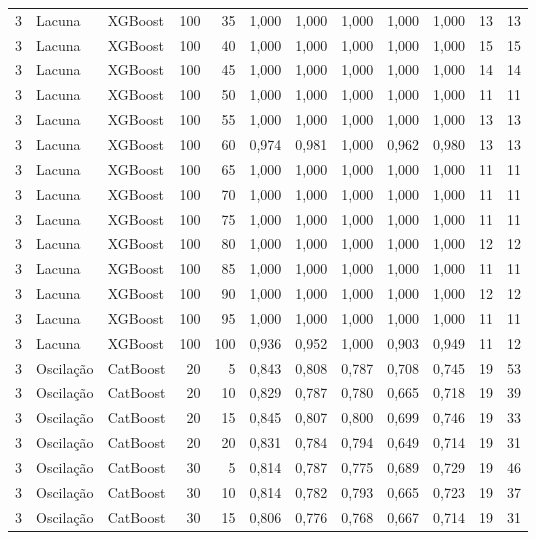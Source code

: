 \begin{longtable}{@{}rllrrrrrrrrr@{}}
3 & Lacuna & XGBoost & 100 & 35 & 1,000 & 1,000 & 1,000 & 1,000 & 1,000 & 13 & 13 \\
3 & Lacuna & XGBoost & 100 & 40 & 1,000 & 1,000 & 1,000 & 1,000 & 1,000 & 15 & 15 \\
3 & Lacuna & XGBoost & 100 & 45 & 1,000 & 1,000 & 1,000 & 1,000 & 1,000 & 14 & 14 \\
3 & Lacuna & XGBoost & 100 & 50 & 1,000 & 1,000 & 1,000 & 1,000 & 1,000 & 11 & 11 \\
3 & Lacuna & XGBoost & 100 & 55 & 1,000 & 1,000 & 1,000 & 1,000 & 1,000 & 13 & 13 \\
3 & Lacuna & XGBoost & 100 & 60 & 0,974 & 0,981 & 1,000 & 0,962 & 0,980 & 13 & 13 \\
3 & Lacuna & XGBoost & 100 & 65 & 1,000 & 1,000 & 1,000 & 1,000 & 1,000 & 11 & 11 \\
3 & Lacuna & XGBoost & 100 & 70 & 1,000 & 1,000 & 1,000 & 1,000 & 1,000 & 11 & 11 \\
3 & Lacuna & XGBoost & 100 & 75 & 1,000 & 1,000 & 1,000 & 1,000 & 1,000 & 11 & 11 \\
3 & Lacuna & XGBoost & 100 & 80 & 1,000 & 1,000 & 1,000 & 1,000 & 1,000 & 12 & 12 \\
3 & Lacuna & XGBoost & 100 & 85 & 1,000 & 1,000 & 1,000 & 1,000 & 1,000 & 11 & 11 \\
3 & Lacuna & XGBoost & 100 & 90 & 1,000 & 1,000 & 1,000 & 1,000 & 1,000 & 12 & 12 \\
3 & Lacuna & XGBoost & 100 & 95 & 1,000 & 1,000 & 1,000 & 1,000 & 1,000 & 11 & 11 \\
3 & Lacuna & XGBoost & 100 & 100 & 0,936 & 0,952 & 1,000 & 0,903 & 0,949 & 11 & 12 \\
3 & Oscilação & CatBoost & 20 & 5 & 0,843 & 0,808 & 0,787 & 0,708 & 0,745 & 19 & 53 \\
3 & Oscilação & CatBoost & 20 & 10 & 0,829 & 0,787 & 0,780 & 0,665 & 0,718 & 19 & 39 \\
3 & Oscilação & CatBoost & 20 & 15 & 0,845 & 0,807 & 0,800 & 0,699 & 0,746 & 19 & 33 \\
3 & Oscilação & CatBoost & 20 & 20 & 0,831 & 0,784 & 0,794 & 0,649 & 0,714 & 19 & 31 \\
3 & Oscilação & CatBoost & 30 & 5 & 0,814 & 0,787 & 0,775 & 0,689 & 0,729 & 19 & 46 \\
3 & Oscilação & CatBoost & 30 & 10 & 0,814 & 0,782 & 0,793 & 0,665 & 0,723 & 19 & 37 \\
3 & Oscilação & CatBoost & 30 & 15 & 0,806 & 0,776 & 0,768 & 0,667 & 0,714 & 19 & 31 \\

\end{longtable}
